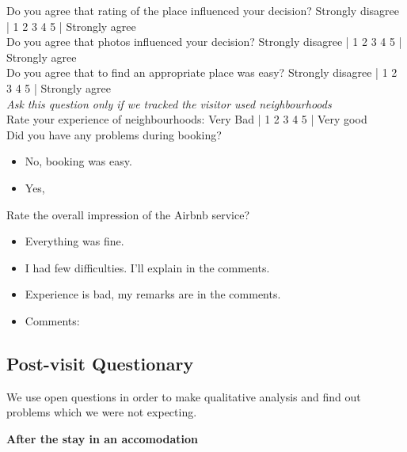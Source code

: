 Do you agree that rating of the place influenced your decision?
\newline
Strongly disagree | 1 2 3 4 5 | Strongly agree \\

Do you agree that photos influenced your decision?
\newline
Strongly disagree | 1 2 3 4 5 | Strongly agree \\

Do you agree that to find an appropriate place was easy?
\newline
Strongly disagree | 1 2 3 4 5 | Strongly agree \\

\textit{Ask this question only if we tracked the visitor used neighbourhoods} \\
Rate your experience of neighbourhoods:
\newline
Very Bad | 1 2 3 4 5 | Very good \\

Did you have any problems during booking?
\begin{itemize}
	\item No, booking was easy.
    \item Yes, \underline{\hspace{8cm}}
\end{itemize}
\vspace{0.2cm}

Rate the overall impression of the Airbnb service?
\begin{itemize}
 \item Everything was fine.
 \item I had few difficulties. I'll explain in the comments.
 \item Experience is bad, my remarks are in the comments.
 \item Comments: \underline{\hspace{8cm}}
\end{itemize}

\subsection{Post-visit Questionary}
\label{sec:Post-visit_Questionary}

We use open questions in order to make qualitative analysis and find out problems which we were not expecting.
\par
\vspace{0.2cm}

\textbf{After the stay in an accomodation}
\vspace{0.2cm}

